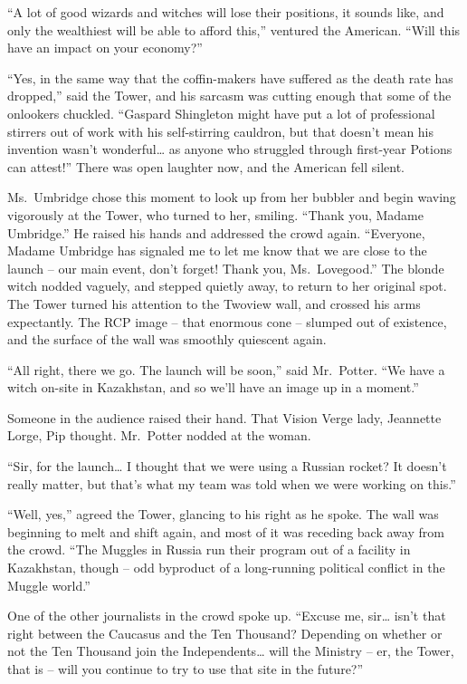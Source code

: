 ``A lot of good wizards and witches will lose their positions, it sounds
like, and only the wealthiest will be able to afford this,'' ventured
the American. ``Will this have an impact on your economy?''

``Yes, in the same way that the coffin-makers have suffered as the death
rate has dropped,'' said the Tower, and his sarcasm was cutting enough
that some of the onlookers chuckled. ``Gaspard Shingleton might have put
a lot of professional stirrers out of work with his self-stirring
cauldron, but that doesn't mean his invention wasn't wonderful\ldots{}
as anyone who struggled through first-year Potions can attest!'' There
was open laughter now, and the American fell silent.

Ms.~Umbridge chose this moment to look up from her bubbler and begin
waving vigorously at the Tower, who turned to her, smiling. ``Thank you,
Madame Umbridge.'' He raised his hands and addressed the crowd again.
``Everyone, Madame Umbridge has signaled me to let me know that we are
close to the launch -- our main event, don't forget! Thank you,
Ms.~Lovegood.'' The blonde witch nodded vaguely, and stepped quietly
away, to return to her original spot. The Tower turned his attention to
the Twoview wall, and crossed his arms expectantly. The RCP image --
that enormous cone -- slumped out of existence, and the surface of the
wall was smoothly quiescent again.

``All right, there we go. The launch will be soon,'' said Mr.~Potter.
``We have a witch on-site in Kazakhstan, and so we'll have an image up
in a moment.''

Someone in the audience raised their hand. That Vision Verge lady,
Jeannette Lorge, Pip thought. Mr.~Potter nodded at the woman.

``Sir, for the launch\ldots{} I thought that we were using a Russian
rocket? It doesn't really matter, but that's what my team was told when
we were working on this.''

``Well, yes,'' agreed the Tower, glancing to his right as he spoke. The
wall was beginning to melt and shift again, and most of it was receding
back away from the crowd. ``The Muggles in Russia run their program out
of a facility in Kazakhstan, though -- odd byproduct of a long-running
political conflict in the Muggle world.''

One of the other journalists in the crowd spoke up. ``Excuse me,
sir\ldots{} isn't that right between the Caucasus and the Ten Thousand?
Depending on whether or not the Ten Thousand join the
Independents\ldots{} will the Ministry -- er, the Tower, that is -- will
you continue to try to use that site in the future?''

